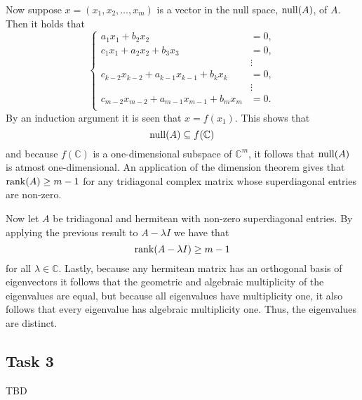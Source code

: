 \documentclass[a4paper,12pt]{article}
\begin{document}
Now suppose \(x = (x_1, x_2, \dots, x_m)\) is a vector in the null space,
\(\mathrm{null}(A)\), of \(A\).
Then it holds that
\[
  \begin{cases}
                      a_1 x_1         + b_2 x_2 &= 0, \\
    c_1 x_1         + a_2 x_2         + b_3 x_3 &= 0, \\
                                                &\vdots \\
    c_{k-2} x_{k-2} + a_{k-1} x_{k-1} + b_k x_k &= 0, \\
                                                &\vdots \\
    c_{m-2} x_{m-2} + a_{m-1} x_{m-1} + b_m x_m &= 0. \\
  \end{cases}
\]
By an induction argument it is seen that \(x = f(x_1)\).
This shows that
\[ \mathrm{null}(A) \subseteq f(\mathbb{C}) \]
and because \(f(\mathbb{C})\) is a one-dimensional subspace of \(\mathbb{C}^m\),
it follows that \(\mathrm{null}(A)\) is atmost one-dimensional.
An application of the dimension theorem gives that \(\mathrm{rank}(A) \ge m - 1\) for
any tridiagonal complex matrix whose superdiagonal entries are non-zero.

Now let \(A\) be tridiagonal and hermitean with non-zero superdiagonal entries.
By applying the previous result to \(A - \lambda I\) we have that
\[ \mathrm{rank}(A - \lambda I) \ge m-1 \]
for all \(\lambda \in \mathbb{C}\).
Lastly, because any hermitean matrix has an orthogonal basis of eigenvectors it
follows that the geometric and algebraic multiplicity of the eigenvalues are
equal, but because all eigenvalues have multiplicity one, it also follows that
every eigenvalue has algebraic multiplicity one.
Thus, the eigenvalues are distinct.


\begin{comment}
The function \(f\) is linear, as is now shown with induction.
It shall be shown that
\begin{equation}\label{eq:f-linear-kth-component}
  (f(sx_1 + ty_1))_k = (sf(x_1) + tf(y_1))_k
\end{equation}
for all \(s, t, x_1, y_1 \in \mathbb{C}\) and \(1 \le k \le m\).
From this it then follows that
\[ f(sx_1 + ty_1) = sf(x_1) + tf(y_1) \]
i.e. that \(f\) is linear.
Firstly,
\[ (f(sx_1 + ty_1))_1 = sx_1 + ty_1 = (sf(x_1) + tf(y_1))_1. \]
Secondly,
\begin{align*}
  (f(sx_1 + ty_1))_2
    &= -\frac{a_1(sx_1 + ty_1)}{b_2} \\
    &= s\left(-\frac{a_1x_1}{b_2}\right) + t\left(-\frac{a_1y_1}{b_2}\right) \\
    &= (sf(x_1) + tf(y_1))_2
\end{align*}
Suppose that \eqref{eq:f-linear-kth-component} holds for \(k=l-2\) and
\(k=l-1\).
Then one has
\end{comment}


\subsection*{Task 3}

TBD
\end{document}
